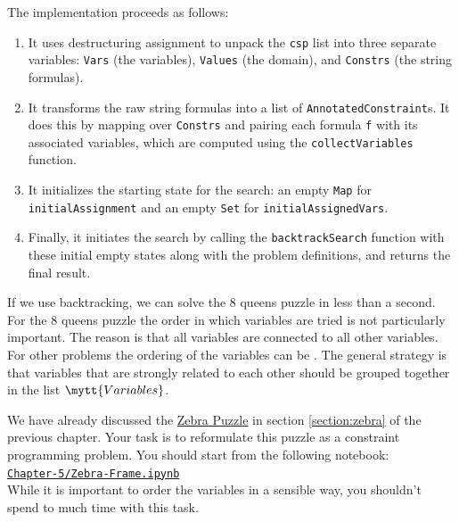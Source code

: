 \begin{enumerate}
  The implementation proceeds as follows:
  \begin{enumerate}
  \item It uses destructuring assignment to unpack the \texttt{csp} list into three separate variables:
    \texttt{Vars} (the variables), \texttt{Values} (the domain), and \texttt{Constrs} (the string formulas). 
  \item It transforms the raw string formulas into a list of \texttt{AnnotatedConstraint}s. It does this by
    mapping over \texttt{Constrs} and pairing each formula \texttt{f} with its associated variables, which are
    computed using the \texttt{collectVariables} function. 
  \item It initializes the starting state for the search: an empty \texttt{Map} for \texttt{initialAssignment}
    and an empty \texttt{Set} for \texttt{initialAssignedVars}. 
  \item Finally, it initiates the search by calling the \texttt{backtrackSearch} function with these initial
    empty states along with the problem definitions, and returns the final result. 
  \end{enumerate}
\end{enumerate}

If we use backtracking, we can solve the 8 queens puzzle in less than a second.
For the 8 queens puzzle the order in which variables are tried is not particularly important.  The reason
is that all variables are connected to all other variables.  For other problems the ordering of the variables
can be .  The general strategy is that variables that are strongly related to each other should
be grouped together in the list $\mytt{Variables}$.

\exerciseEng
We have already discussed the \href{https://en.wikipedia.org/wiki/Zebra_puzzle}{Zebra Puzzle} in section
\ref{section:zebra} of the previous chapter.  Your task is to reformulate this puzzle as a constraint
programming problem.  You should start from the following notebook:
\\[0.2cm]
\hspace*{1.3cm}
\href{https://github.com/karlstroetmann/Logic/blob/master/TypeScript/Chapter-5/Zebra-Frame.ipynb}{\texttt{Chapter-5/Zebra-Frame.ipynb}}
\\[0.2cm]
While it is important to order the variables in a sensible way, you shouldn't spend to much time with this
task.
\eox

